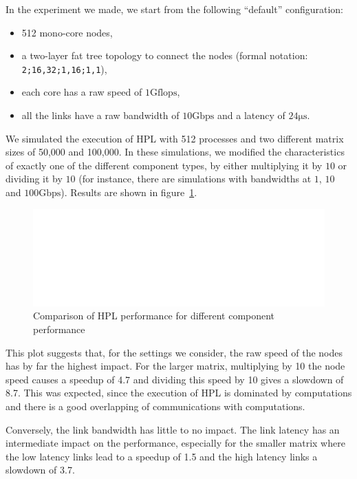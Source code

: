 \documentclass[12pt, a4paper]{memoir}
\begin{document}
In the experiment we made, we start from the following “default” configuration:
\begin{itemize}
\item 512 mono-core nodes,
\item a two-layer fat tree topology to connect the nodes (formal notation: \texttt{2;16,32;1,16;1,1}),
\item each core has a raw speed of \(1 \mathrm{Gflops}\),
\item all the links have a raw bandwidth of \(10 \mathrm{Gbps}\) and a latency of \(24\mathrm{\mu s}\).
\end{itemize}
We simulated the execution of HPL with 512 processes and two different matrix sizes of 50,000 and 100,000. In these
simulations, we modified the characteristics of exactly one of the different component types, by either multiplying
it by \(10\) or dividing it by \(10\) (for instance, there are simulations with bandwidths at \(1\), \(10\) and \(100
    \mathrm{Gbps}\)). Results are shown in figure~\ref{fig:capacity_planning_components}.

\begin{figure}[htpb]
\centering
\includegraphics[width=\linewidth, page=2]{../capacity_planning/components_perf.pdf}
\caption{Comparison of HPL performance for different component performance}
\label{fig:capacity_planning_components}
\end{figure}

This plot suggests that, for the settings we consider, the raw speed of the nodes has by far the highest impact. For
the larger matrix, multiplying by 10 the node speed causes a speedup of 4.7 and dividing this speed by 10 gives a
slowdown of 8.7. This was expected, since the execution of HPL is dominated by computations and there is a good
overlapping of communications with computations.

Conversely, the link bandwidth has little to no impact. The link latency has an intermediate impact on the
performance, especially for the smaller matrix where the low latency links lead to a speedup of 1.5 and the high
latency links a slowdown of 3.7.
\end{document}
